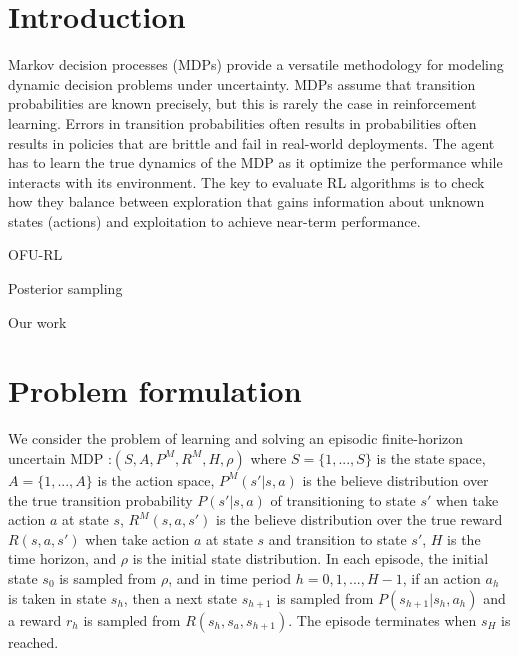 \documentclass{article}
\begin{document}
\section{Introduction}






Markov decision processes (MDPs) provide a versatile methodology for
modeling dynamic decision problems under uncertainty. MDPs assume that
transition probabilities are known precisely, but this is rarely the
case in reinforcement learning. Errors in transition probabilities
often results in probabilities often results in policies that are
brittle and fail in real-world deployments. The agent has to learn the
true dynamics of the MDP as it optimize the performance while
interacts with its environment. The key to evaluate RL algorithms is
to check how they balance between exploration that gains information
about unknown states (actions) and exploitation to  achieve near-term
performance. 


OFU-RL

Posterior sampling

Our work


\section{Problem formulation}

We consider the problem of learning and solving an episodic
finite-horizon uncertain MDP :$(S, A, P^M, R^M, H, \rho)$ where $S =
\{1,...,S\}$ is the state space, $A = \{1,...,A\}$ is the action
space,  $P^M(s'|s,a)$ is the believe distribution over the true
transition probability $P(s'|s,a)$ of transitioning to state $s'$ when
take action $a$ at state $s$, $R^M(s,a,s')$ is the believe
distribution over the true reward $R(s,a,s')$ when take action $a$ at
state $s$ and transition to state $s'$, $H$ is the time horizon, and
$\rho$ is the initial state distribution. In each episode, the initial
state $s_0$ is sampled from $\rho$, and in time period
$h=0,1,...,H-1$, if an action $a_h$ is taken in state $s_h$, then a
next state $s_{h+1}$ is sampled from $P(s_{h+1}|s_h,a_h)$ and a reward
$r_h$ is sampled from $R(s_h,s_a,s_{h+1})$. The episode terminates
when $s_H$ is reached. 
\end{document}
